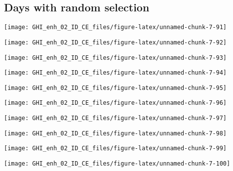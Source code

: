 \documentclass[
  10pt,
  a4paper,oneside]{article}
\begin{document}
\hypertarget{days-with-random-selection}{%
\subsection{Days with random selection}\label{days-with-random-selection}}

\begin{center}\texttt{[image: GHI\_enh\_02\_ID\_CE\_files/figure-latex/unnamed-chunk-7-91]} \end{center}

\begin{center}\texttt{[image: GHI\_enh\_02\_ID\_CE\_files/figure-latex/unnamed-chunk-7-92]} \end{center}

\begin{center}\texttt{[image: GHI\_enh\_02\_ID\_CE\_files/figure-latex/unnamed-chunk-7-93]} \end{center}

\begin{center}\texttt{[image: GHI\_enh\_02\_ID\_CE\_files/figure-latex/unnamed-chunk-7-94]} \end{center}

\begin{center}\texttt{[image: GHI\_enh\_02\_ID\_CE\_files/figure-latex/unnamed-chunk-7-95]} \end{center}

\begin{center}\texttt{[image: GHI\_enh\_02\_ID\_CE\_files/figure-latex/unnamed-chunk-7-96]} \end{center}

\begin{center}\texttt{[image: GHI\_enh\_02\_ID\_CE\_files/figure-latex/unnamed-chunk-7-97]} \end{center}

\begin{center}\texttt{[image: GHI\_enh\_02\_ID\_CE\_files/figure-latex/unnamed-chunk-7-98]} \end{center}

\begin{center}\texttt{[image: GHI\_enh\_02\_ID\_CE\_files/figure-latex/unnamed-chunk-7-99]} \end{center}

\begin{center}\texttt{[image: GHI\_enh\_02\_ID\_CE\_files/figure-latex/unnamed-chunk-7-100]} \end{center}
\end{document}

